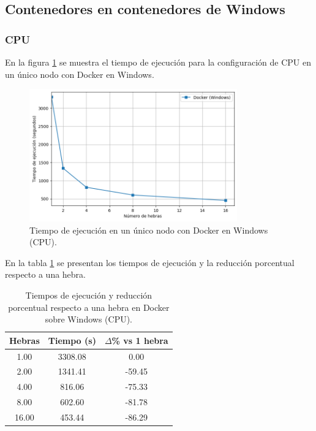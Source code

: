 \subsection{Contenedores en contenedores de Windows}
\subsubsection{CPU}

En la figura \ref{fig:single-node_windows_docker_time} se muestra el tiempo de ejecución para la configuración de CPU en un único nodo con Docker en Windows.

\begin{figure}[H]
    \centering
    \includegraphics[width=0.8\textwidth]{imagenes/cap5/single-node_windows_docker_time.png}
    \caption{Tiempo de ejecución en un único nodo con Docker en Windows (CPU).}
    \label{fig:single-node_windows_docker_time}
\end{figure}

En la tabla \ref{tab:single-node_windows_docker_time} se presentan los tiempos de ejecución y la reducción porcentual respecto a una hebra.

\begin{table}[ht]
    \centering
    \begin{tabular}{|c|c|c|}
        \hline
        \textbf{Hebras} & \textbf{Tiempo (s)} & \textbf{$\Delta$\% vs 1 hebra} \\
        \hline
        1.00            & 3308.08             & 0.00                           \\
        2.00            & 1341.41             & -59.45                         \\
        4.00            & 816.06              & -75.33                         \\
        8.00            & 602.60              & -81.78                         \\
        16.00           & 453.44              & -86.29                         \\
        \hline
    \end{tabular}
    \caption{Tiempos de ejecución y reducción porcentual respecto a una hebra en Docker sobre Windows (CPU).}
    \label{tab:single-node_windows_docker_time}
\end{table}

